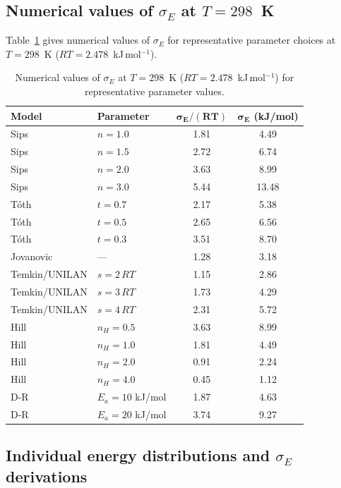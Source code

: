 \documentclass[journal=jacsat,manuscript=article]{achemso}
\begin{document}
\subsection{Numerical values of $\sigma_E$ at $T = 298$~K}
\label{sec:si_sigma_numerical}

Table~\ref{tab:si_sigma_numerical} gives numerical values of $\sigma_E$
for representative parameter choices at $T = 298$~K
($RT = 2.478$~kJ\,mol$^{-1}$).

\begin{table}[H]
	\centering
	\small
	\caption{Numerical values of $\sigma_E$ at $T = 298$~K
		($RT = 2.478$~kJ\,mol$^{-1}$) for representative parameter values.}
	\label{tab:si_sigma_numerical}
	\renewcommand{\arraystretch}{1.3}
	\begin{tabular}{@{} l l c c @{}}
		\toprule
		\textbf{Model} & \textbf{Parameter}
		& $\boldsymbol{\sigma_E/(RT)}$
		& $\boldsymbol{\sigma_E}$ (kJ/mol) \\
		\midrule
		Sips & $n = 1.0$ & 1.81 & 4.49 \\
		Sips & $n = 1.5$ & 2.72 & 6.74 \\
		Sips & $n = 2.0$ & 3.63 & 8.99 \\
		Sips & $n = 3.0$ & 5.44 & 13.48 \\
		\midrule
		T\'{o}th & $t = 0.7$ & 2.17 & 5.38 \\
		T\'{o}th & $t = 0.5$ & 2.65 & 6.56 \\
		T\'{o}th & $t = 0.3$ & 3.51 & 8.70 \\
		\midrule
		Jovanovic & --- & 1.28 & 3.18 \\
		\midrule
		Temkin/UNILAN & $s = 2\,RT$ & 1.15 & 2.86 \\
		Temkin/UNILAN & $s = 3\,RT$ & 1.73 & 4.29 \\
		Temkin/UNILAN & $s = 4\,RT$ & 2.31 & 5.72 \\
		\midrule
		Hill & $n_H = 0.5$ & 3.63 & 8.99 \\
		Hill & $n_H = 1.0$ & 1.81 & 4.49 \\
		Hill & $n_H = 2.0$ & 0.91 & 2.24 \\
		Hill & $n_H = 4.0$ & 0.45 & 1.12 \\
		\midrule
		D-R & $E_a = 10$ kJ/mol & 1.87 & 4.63 \\
		D-R & $E_a = 20$ kJ/mol & 3.74 & 9.27 \\
		\bottomrule
	\end{tabular}
\end{table}

\subsection{Individual energy distributions and $\sigma_E$ derivations}
\label{sec:si_individual_distributions}
\end{document}
